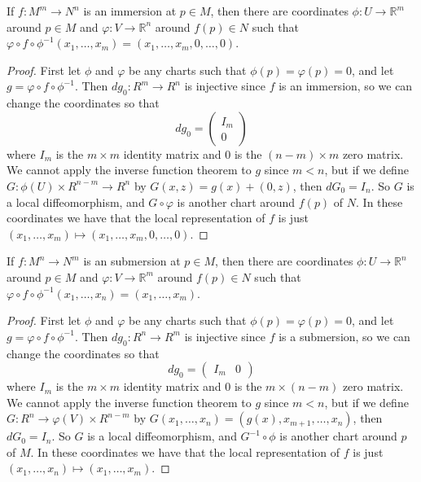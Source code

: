 \begin{cor}
If $f : M^m \rightarrow N^n$ is an immersion at $p \in M$, then there are coordinates $\phi : U \rightarrow \mathbb R^m$ around $p \in M$ and $\varphi : V \rightarrow \mathbb R^n$ around $f(p) \in N$ such that $\varphi \circ f \circ \phi^{-1}(x_1,\ldots,x_m) = (x_1,\ldots,x_m,0,\ldots,0)$.
\end{cor}
\begin{proof}
First let $\phi$ and $\varphi$ be any charts such that $\phi(p)=\varphi(p)=0$, and let $g = \varphi \circ f \circ \phi^{-1}$. Then $dg_0 : R^m \rightarrow R^n$ is injective since $f$ is an immersion, so we can change the coordinates so that
\[ dg_0 = \begin{pmatrix} I_m \\ 0 \end{pmatrix} \]
where $I_m$ is the $m \times m$ identity matrix and $0$ is the $(n-m) \times m$ zero matrix. We cannot apply the inverse function theorem to $g$ since $m < n$, but if we define $G : \phi(U) \times R^{n-m} \rightarrow R^n$ by $G(x,z) = g(x)+(0,z)$, then $dG_0 = I_n$. So $G$ is a local diffeomorphism, and $G \circ \varphi$ is another chart around $f(p)$ of $N$. In these coordinates we have that the local representation of $f$ is just $(x_1,\ldots,x_m) \mapsto (x_1,\ldots,x_m,0,\ldots,0)$. 
\end{proof}

\begin{cor}
\label{local submersion theorem}
If $f : M^n \rightarrow N^m$ is an submersion at $p \in M$, then there are coordinates $\phi : U \rightarrow \mathbb R^n$ around $p \in M$ and $\varphi : V \rightarrow \mathbb R^m$ around $f(p) \in N$ such that $\varphi \circ f \circ \phi^{-1}(x_1,\ldots,x_n) = (x_1,\ldots,x_m)$.
\end{cor}
\begin{proof}
First let $\phi$ and $\varphi$ be any charts such that $\phi(p)=\varphi(p)=0$, and let $g = \varphi \circ f \circ \phi^{-1}$. Then $dg_0 : R^n \rightarrow R^m$ is injective since $f$ is a submersion, so we can change the coordinates so that
\[ dg_0 = \begin{pmatrix} I_m & 0 \end{pmatrix} \]
where $I_m$ is the $m \times m$ identity matrix and $0$ is the $m \times (n-m)$ zero matrix. We cannot apply the inverse function theorem to $g$ since $m < n$, but if we define $G : R^n \rightarrow \varphi(V) \times R^{n-m}$ by $G(x_1,\ldots,x_n) = (g(x),x_{m+1},\ldots,x_n)$, then $dG_0 = I_n$. So $G$ is a local diffeomorphism, and $G^{-1} \circ \phi$ is another chart around $p$ of $M$. In these coordinates we have that the local representation of $f$ is just $(x_1,\ldots,x_n) \mapsto (x_1,\ldots,x_m)$. 
\end{proof}

